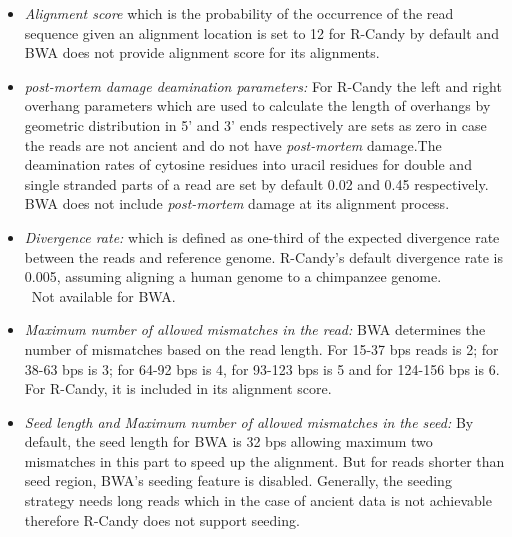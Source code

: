 \documentclass[11pt,a4paper]{report}
\begin{document}
\begin{itemize} 
 \item \emph{Alignment score}  which is the probability of the occurrence of the read sequence given an alignment location is set to 12 for R-Candy by default and BWA does not provide alignment score for its alignments.
 
 \item \emph{post-mortem damage deamination parameters:} For R-Candy the left and right overhang parameters which are used to calculate the length of overhangs by geometric distribution in 5' and 3' ends respectively are sets as zero in case the reads are not ancient and do not have \emph{post-mortem} damage.The deamination rates of cytosine residues into uracil residues for double and single stranded parts of a read are set by default 0.02 and 0.45 respectively.\\
BWA does not include \emph{post-mortem} damage at its alignment process.

 
 \item \emph{Divergence rate:} which is defined as one-third of the expected divergence rate between the reads and reference genome.  R-Candy's default divergence rate is 0.005,  assuming aligning a human genome to a chimpanzee genome.\\\
 Not available for BWA.
  
  
 \item \emph{Maximum number of allowed mismatches in the read:}  BWA determines the number of mismatches based on the read length. For 15-37 bps reads is 2; for 38-63 bps is 3; for 64-92 bps is 4, for 93-123 bps is 5 and for 124-156 bps is 6\cite{bwa}.
For R-Candy, it is included in its alignment score.

 \item \emph{Seed length and Maximum number of allowed mismatches in the seed:} By default, the seed length for BWA is 32 bps allowing maximum two mismatches in this part to speed up the alignment. But for reads shorter than seed region, BWA's seeding feature is disabled.
Generally, the seeding strategy needs long reads which in the case of ancient data is not achievable therefore R-Candy does not support seeding.
 

\end{itemize} 
\end{document}
